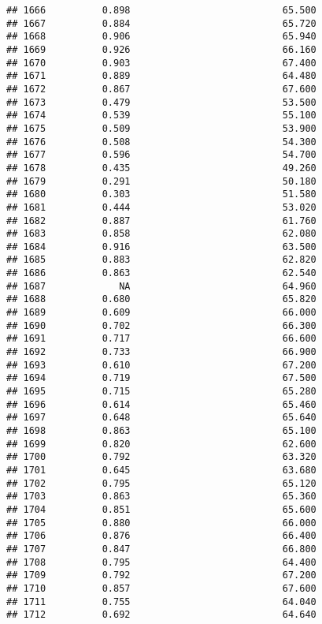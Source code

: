 \documentclass[
]{article}
\begin{document}
\begin{verbatim}
## 1666          0.898                           65.500
## 1667          0.884                           65.720
## 1668          0.906                           65.940
## 1669          0.926                           66.160
## 1670          0.903                           67.400
## 1671          0.889                           64.480
## 1672          0.867                           67.600
## 1673          0.479                           53.500
## 1674          0.539                           55.100
## 1675          0.509                           53.900
## 1676          0.508                           54.300
## 1677          0.596                           54.700
## 1678          0.435                           49.260
## 1679          0.291                           50.180
## 1680          0.303                           51.580
## 1681          0.444                           53.020
## 1682          0.887                           61.760
## 1683          0.858                           62.080
## 1684          0.916                           63.500
## 1685          0.883                           62.820
## 1686          0.863                           62.540
## 1687             NA                           64.960
## 1688          0.680                           65.820
## 1689          0.609                           66.000
## 1690          0.702                           66.300
## 1691          0.717                           66.600
## 1692          0.733                           66.900
## 1693          0.610                           67.200
## 1694          0.719                           67.500
## 1695          0.715                           65.280
## 1696          0.614                           65.460
## 1697          0.648                           65.640
## 1698          0.863                           65.100
## 1699          0.820                           62.600
## 1700          0.792                           63.320
## 1701          0.645                           63.680
## 1702          0.795                           65.120
## 1703          0.863                           65.360
## 1704          0.851                           65.600
## 1705          0.880                           66.000
## 1706          0.876                           66.400
## 1707          0.847                           66.800
## 1708          0.795                           64.400
## 1709          0.792                           67.200
## 1710          0.857                           67.600
## 1711          0.755                           64.040
## 1712          0.692                           64.640

\end{verbatim}
\end{document}

